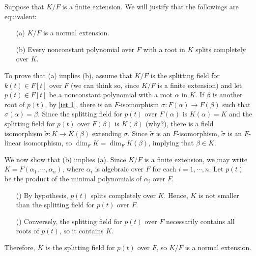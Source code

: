 \begin{exmp}
    Suppose that $K/F$ is a finite extension.
    We will justify that the followings are equivalent:
    \begin{enumerate}
        \item[(a)]
        {
            $K/F$ is a normal extension.
        }
        \item[(b)]
        {
            Every nonconstant polynomial over $F$ with a root in $K$ splits completely over $K$.
        }
    \end{enumerate}

    To prove that (a) implies (b), assume that $K/F$ is the splitting field for $k(t)\in F[t]$ over $F$ (we can think so, since $K/F$ is a finite extension) and let $p(t)\in F[t]$ be a nonconstant polynomial with a root $\alpha$ in $K$.
    If $\beta$ is another root of $p(t)$, by \cref{iet 1}, there is an $F$-isomorphism $\sigma: F(\alpha)\rightarrow F(\beta)$ such that $\sigma(\alpha)=\beta$.
    Since the splitting field for $p(t)$ over $F(\alpha)$ is $K(\alpha)=K$ and the splitting field for $p(t)$ over $F(\beta)$ is $K(\beta)$ \color{brown}(why?)\color{black}, there is a field isomorphism $\widetilde{\sigma}: K\rightarrow K(\beta)$ extending $\sigma$.
    Since $\widetilde{\sigma}$ is an $F$-isomorphism, $\widetilde{\sigma}$ is an $F$-linear isomorphism, so $\dim_F K=\dim_F K(\beta)$, implying that $\beta\in K$.

    We now show that (b) implies (a).
    Since $K/F$ is a finite extension, we may write $K=F(\alpha_1, \cdots, \alpha_n)$, where $\alpha_i$ is algebraic over $F$ for each $i=1, \cdots, n$.
    Let $p(t)$ be the product of the minimal polynomials of $\alpha_i$ over $F$.
    \begin{enumerate}
        \item[(\romannumeral 1)]
        {
            By hypothesis, $p(t)$ splits completely over $K$.
            Hence, $K$ is not smaller than the splitting field for $p(t)$ over $F$.
        }
        \item[(\romannumeral 2)]
        {
            Conversely, the splitting field for $p(t)$ over $F$ necessarily contains all roots of $p(t)$, so it contains $K$.
        }
    \end{enumerate}
    Therefore, $K$ is the splitting field for $p(t)$ over $F$, so $K/F$ is a normal extension.
\end{exmp}
